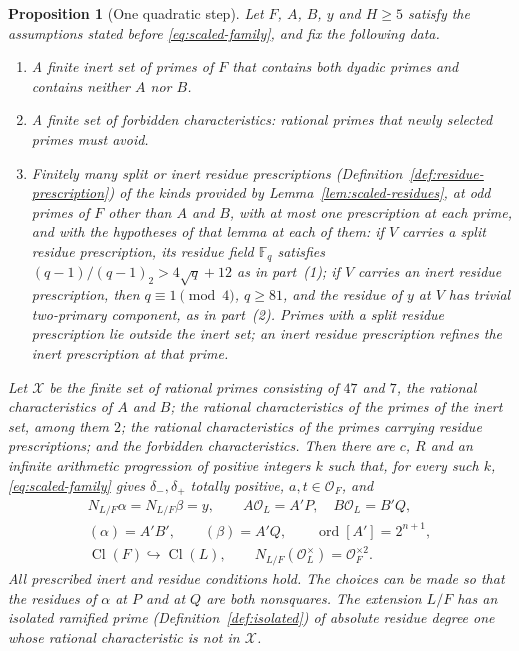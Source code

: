 \documentclass[11pt]{article}
\theoremstyle{plain}
\newtheorem{proposition}[theorem]{Proposition}
\theoremstyle{definition}
\theoremstyle{remark}
\DeclareMathOperator{\Cl}{Cl}
\DeclareMathOperator{\ord}{ord}
\newcommand{\F}{\mathbb F}
\newcommand{\OO}{\mathcal O}
\begin{document}
\begin{proposition}[One quadratic step]\label{prop:scaled-step}
Let $F$, $A$, $B$, $y$ and $H\ge5$ satisfy the assumptions stated before
\eqref{eq:scaled-family}, and fix the following data.
\begin{enumerate}
\item[(a)] A finite inert set of primes of $F$ that contains both dyadic
primes and contains neither $A$ nor $B$.
\item[(b)] A finite set of \emph{forbidden characteristics}: rational
primes that newly selected primes must avoid.
\item[(c)] Finitely many split or inert residue prescriptions
(Definition~\ref{def:residue-prescription}) of the kinds provided by
Lemma~\ref{lem:scaled-residues}, at odd primes of $F$ other than $A$ and
$B$, with at most one prescription at each prime, and with the
hypotheses of that lemma at each of them: if $V$ carries a split residue
prescription, its residue field $\F_q$ satisfies
$(q-1)/(q-1)_2>4\sqrt q+12$ as in part~(1); if $V$ carries an inert
residue prescription, then $q\equiv1\pmod4$, $q\ge81$, and the residue
of $y$ at $V$ has trivial two-primary component, as in part~(2).
Primes with a split
residue prescription lie outside the inert set; an inert residue
prescription refines the inert prescription at that prime.
\end{enumerate}
Let $\mathcal X$ be the finite set of rational primes consisting of $47$
and $7$, the rational characteristics of $A$ and $B$; the rational
characteristics of the primes of the inert set, among them $2$; the
rational characteristics of the primes carrying residue prescriptions;
and the forbidden characteristics.  Then there are $c$, $R$ and an
infinite arithmetic progression of positive integers $k$ such that, for
every such $k$, \eqref{eq:scaled-family} gives $\delta_-,\delta_+$
totally positive, $a,t\in\OO_F$, and
\begin{gather*}
 N_{L/F}\alpha=N_{L/F}\beta=y,\qquad
 A\OO_L=A'P,\quad B\OO_L=B'Q,\\
 (\alpha)=A'B',\qquad (\beta)=A'Q,\qquad
 \ord[A']=2^{n+1},\\
 \Cl(F)\hookrightarrow\Cl(L),\qquad
 N_{L/F}(\OO_L^\times)=\OO_F^{\times2}.
\end{gather*}
All prescribed inert and residue conditions hold.  The choices can be
made so that the residues of $\alpha$ at $P$ and at $Q$ are both
nonsquares.  The extension $L/F$ has an isolated ramified prime
(Definition~\ref{def:isolated}) of absolute residue degree one whose
rational characteristic is not in $\mathcal X$.
\end{proposition}
\end{document}
